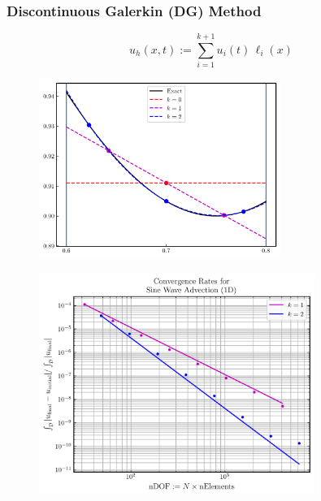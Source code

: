 \documentclass{beamer}
\begin{document}
\begin{frame}
\frametitle{Discontinuous Galerkin (DG) Method}

  \Fontvi

  \begin{equation*}
    u_{h}\left(x,t\right)
    :=\sum\limits_{i=1}^{k+1}
      u_{i}\left(t\right)\,\ell_{i}\left(x\right)
  \end{equation*}

  \begin{figure}[htb!]
    \centering
    \includegraphics[width=0.7\textwidth]{fig.DG_1D.png}
  \end{figure}

\end{frame}

\begin{frame}

  \begin{figure}[htb!]
    \centering
    \includegraphics[width=0.8\textwidth]{fig.ConvergenceRates.png}
  \end{figure}

\end{frame}
\end{document}
